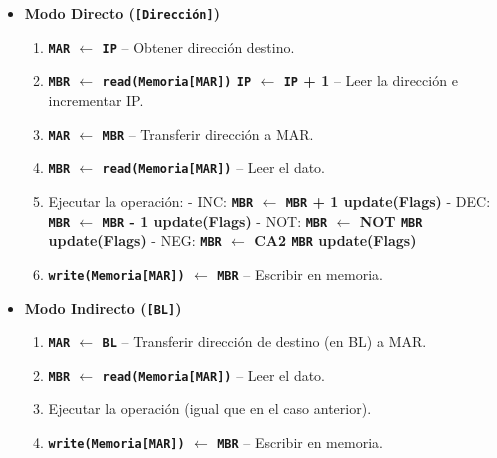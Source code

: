 \documentclass[12pt,oneside]{templates/unerthesis}
\providecommand{\tightlist}{%
  \setlength{\itemsep}{0pt}\setlength{\parskip}{0pt}}
\begin{document}
\begin{itemize}
\begin{itemize}
\begin{itemize}
      \begin{itemize}
      \tightlist
      \item
        \textbf{Modo Directo (\texttt{{[}Dirección{]}})}

        \begin{enumerate}
        \def\labelenumi{\arabic{enumi}.}
        \setcounter{enumi}{3}
        \tightlist
        \item
          \textbf{\texttt{MAR} \(\leftarrow\) \texttt{IP}} -- Obtener dirección destino.
        \item
          \textbf{\texttt{MBR} \(\leftarrow\) \texttt{read(Memoria{[}MAR{]})} \textbar{} \texttt{IP} \(\leftarrow\) \texttt{IP} + 1} -- Leer la dirección e incrementar IP.
        \item
          \textbf{\texttt{MAR} \(\leftarrow\) \texttt{MBR}} -- Transferir dirección a MAR.
        \item
          \textbf{\texttt{MBR} \(\leftarrow\) \texttt{read(Memoria{[}MAR{]})}} -- Leer el dato.
        \item
          Ejecutar la operación:
          - INC: \textbf{\texttt{MBR} \(\leftarrow\) \texttt{MBR} + 1 \textbar{} update(Flags)}
          - DEC: \textbf{\texttt{MBR} \(\leftarrow\) \texttt{MBR} - 1 \textbar{} update(Flags)}
          - NOT: \textbf{\texttt{MBR} \(\leftarrow\) NOT \texttt{MBR} \textbar{} update(Flags)}
          - NEG: \textbf{\texttt{MBR} \(\leftarrow\) CA2 \texttt{MBR} \textbar{} update(Flags)}
        \item
          \textbf{\texttt{write(Memoria{[}MAR{]})} \(\leftarrow\) \texttt{MBR}} -- Escribir en memoria.
        \end{enumerate}
      \item
        \textbf{Modo Indirecto (\texttt{{[}BL{]}})}

        \begin{enumerate}
        \def\labelenumi{\arabic{enumi}.}
        \setcounter{enumi}{3}
        \tightlist
        \item
          \textbf{\texttt{MAR} \(\leftarrow\) \texttt{BL}} -- Transferir dirección de destino (en BL) a MAR.
        \item
          \textbf{\texttt{MBR} \(\leftarrow\) \texttt{read(Memoria{[}MAR{]})}} -- Leer el dato.
        \item
          Ejecutar la operación (igual que en el caso anterior).
        \item
          \textbf{\texttt{write(Memoria{[}MAR{]})} \(\leftarrow\) \texttt{MBR}} -- Escribir en memoria.
        \end{enumerate}
      \end{itemize}
    \end{itemize}
  \end{itemize}
\end{itemize}
\end{document}
